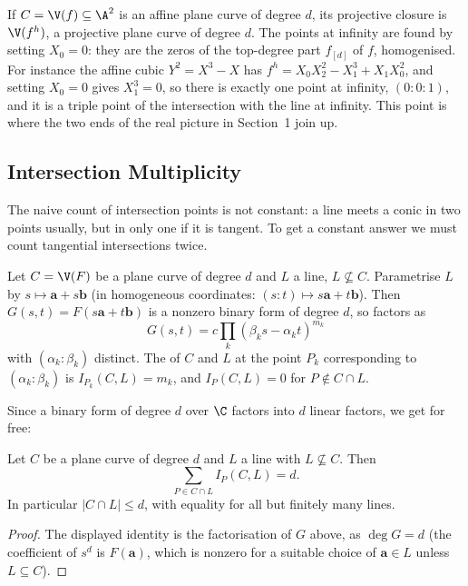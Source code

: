 \begin{example}
	If $C = \V(f) \subseteq \A^2$ is an affine plane curve of degree $d$, its projective closure is $\V(f^h)$, a projective plane curve of degree $d$. The points at infinity are found by setting $X_0 = 0$: they are the zeros of the top-degree part $f_{[d]}$ of $f$, homogenised. For instance the affine cubic $Y^2 = X^3 - X$ has $f^h = X_0X_2^2 - X_1^3 + X_1X_0^2$, and setting $X_0 = 0$ gives $X_1^3 = 0$, so there is exactly one point at infinity, $(0:0:1)$, and it is a triple point of the intersection with the line at infinity. This point is where the two ends of the real picture in Section~1 join up.
\end{example}

\subsection{Intersection Multiplicity}

The naive count of intersection points is not constant: a line meets a conic in two points usually, but in only one if it is tangent. To get a constant answer we must count tangential intersections twice.

\begin{definition}
	Let $C = \V(F)$ be a plane curve of degree $d$ and $L$ a line, $L \not\subseteq C$. Parametrise $L$ by $s \mapsto \mathbf a + s\mathbf b$ (in homogeneous coordinates: $(s:t)\mapsto s\mathbf a + t \mathbf b$). Then $G(s,t) = F(s\mathbf a + t\mathbf b)$ is a nonzero binary form of degree $d$, so factors as
	$$G(s,t) = c\prod_{k}(\beta_k s - \alpha_k t)^{m_k}$$
	with $(\alpha_k:\beta_k)$ distinct. The  of $C$ and $L$ at the point $P_k$ corresponding to $(\alpha_k : \beta_k)$ is $I_{P_k}(C,L) = m_k$, and $I_P(C,L) = 0$ for $P \notin C \cap L$.
\end{definition}

Since a binary form of degree $d$ over $\C$ factors into $d$ linear factors, we get for free:

\begin{proposition}\label{prop:bezoutline}
	Let $C$ be a plane curve of degree $d$ and $L$ a line with $L \not\subseteq C$. Then
	$$\sum_{P \in C\cap L} I_P(C,L) = d.$$
	In particular $|C \cap L| \leq d$, with equality for all but finitely many lines.
\end{proposition}

\begin{proof}
	The displayed identity is the factorisation of $G$ above, as $\deg G = d$ (the coefficient of $s^d$ is $F(\mathbf a)$, which is nonzero for a suitable choice of $\mathbf a \in L$ unless $L \subseteq C$).
\end{proof}

